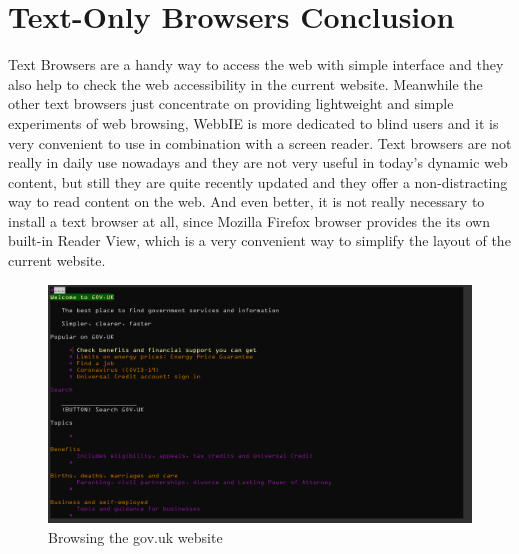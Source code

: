 

\section{Text-Only Browsers Conclusion}

Text Browsers are a handy way to access the web with simple 
interface and they also help to check the web accessibility 
in the current website. Meanwhile the other text browsers just 
concentrate on providing lightweight and simple experiments of 
web browsing, WebbIE is more dedicated to blind users and it is 
very convenient to use in combination with a screen reader. Text 
browsers are not really in daily use nowadays and they are not very 
useful in today's dynamic web content, but still they are quite 
recently updated and they offer a non-distracting way to read 
content on the web. And even better, it is not really necessary to 
install a text browser at all, since Mozilla Firefox browser provides the 
its own built-in Reader View, which is a very convenient way to simplify 
the layout of the current website.


\begin{figure}[tp]
\centering
\includegraphics[keepaspectratio,width=\linewidth]
{images/lynx-gov}

\caption[Lynx Browser]
{%
Browsing the gov.uk website
}%
\label{fig:lynx-gov}
\end{figure}


